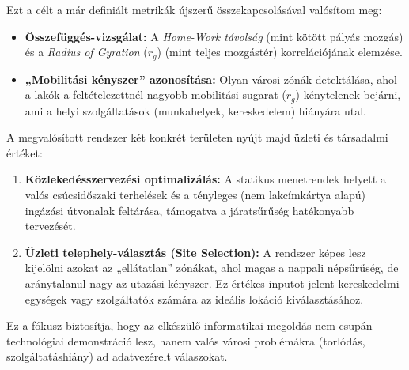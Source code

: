 Ezt a célt a már definiált metrikák újszerű összekapcsolásával valósítom meg:

\begin{itemize}
    \item \textbf{Összefüggés-vizsgálat:} A \textit{Home-Work távolság} (mint kötött pályás mozgás) és a \textit{Radius of Gyration} ($r_g$) (mint teljes mozgástér) korrelációjának elemzése.
    \item \textbf{„Mobilitási kényszer” azonosítása:} Olyan városi zónák detektálása, ahol a lakók a feltételezettnél nagyobb mobilitási sugarat ($r_g$) kénytelenek bejárni, ami a helyi szolgáltatások (munkahelyek, kereskedelem) hiányára utal.
\end{itemize}

A megvalósított rendszer két konkrét területen nyújt majd üzleti és társadalmi értéket:

\begin{enumerate}
    \item \textbf{Közlekedésszervezési optimalizálás:} A statikus menetrendek helyett a valós csúcsidőszaki terhelések és a tényleges (nem lakcímkártya alapú) ingázási útvonalak feltárása, támogatva a járatsűrűség hatékonyabb tervezését.
    \item \textbf{Üzleti telephely-választás (Site Selection):} A rendszer képes lesz kijelölni azokat az „ellátatlan” zónákat, ahol magas a nappali népsűrűség, de aránytalanul nagy az utazási kényszer. Ez értékes inputot jelent kereskedelmi egységek vagy szolgáltatók számára az ideális lokáció kiválasztásához.
\end{enumerate}

Ez a fókusz biztosítja, hogy az elkészülő informatikai megoldás nem csupán technológiai demonstráció lesz, hanem valós városi problémákra (torlódás, szolgáltatáshiány) ad adatvezérelt válaszokat.
